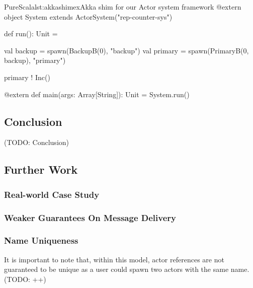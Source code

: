 \documentclass[a4paper,twoside]{article}
\newcommand{\TODO}[1]{\textcolor{YellowOrange}{(TODO: #1)}} %
\begin{document}
\begin{Code}{PureScala}{lst:akkashimex}{Akka shim for our Actor system framework}
@extern
object System extends ActorSystem("rep-counter-sys") {
  def run(): Unit = {
    val backup  = spawn(BackupB(0), "backup")
    val primary = spawn(PrimaryB(0, backup), "primary")

    primary ! Inc()
  }
}

@extern
def main(args: Array[String]): Unit = {
  System.run()
}
\end{Code}

\subsection{Conclusion}

\TODO{Conclusion}

\subsection{Further Work}

\subsubsection*{Real-world Case Study}

\subsubsection*{Weaker Guarantees On Message Delivery}

\subsubsection*{Name Uniqueness}

It is important to note that, within this model, actor references are not guaranteed to be unique as a user could spawn two actors with the same name. \TODO{++}
\end{document}
